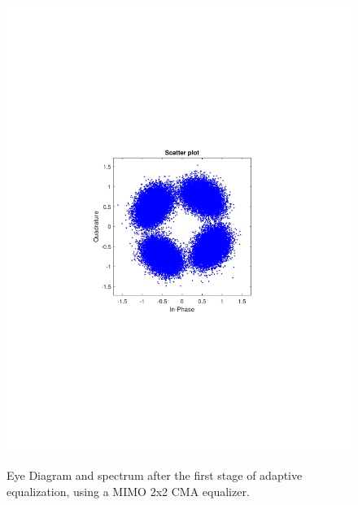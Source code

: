 \begin{refsection}
\begin{figure}[H]
\begin{minipage}{0.30\textwidth}
		\includegraphics[clip, trim=4cm 8cm 4cm 8cm, width=1\textwidth]{./sdf/m_qam_system/figures/expResults/homodyne/3_const_4GBdInSig13dBc_AfMIMO1.pdf}
		\label{fig:4GBdSpecBefFec}
	\end{minipage}
	\caption{Eye Diagram and spectrum after the first stage of adaptive equalization, using a MIMO 2x2 CMA equalizer.}
\end{figure}


\end{refsection}
